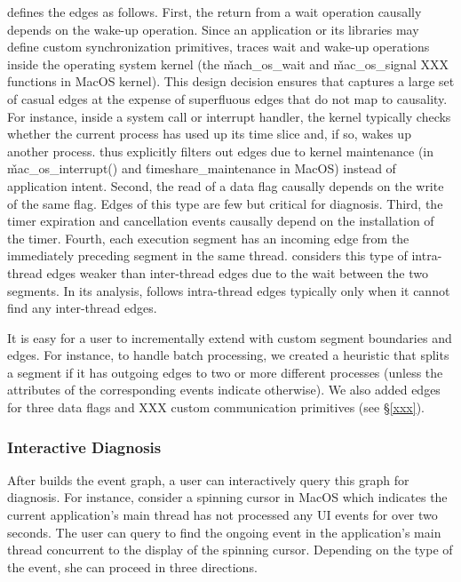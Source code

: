 \xxx defines the edges as follows.  First, the return from a wait
operation causally depends on the wake-up operation.  Since an application
or its libraries may define custom synchronization primitives, \xxx traces
wait and wake-up operations inside the operating system kernel (the
\v{mach\_os\_wait} and \v{mac\_os\_signal} XXX functions in MacOS kernel).
This design decision ensures that \xxx captures a large set of casual
edges at the expense of superfluous edges that do not map to causality.
For instance, inside a system call or interrupt handler, the kernel
typically checks whether the current process has used up its time slice
and, if so, wakes up another process.  \xxx thus explicitly filters out
edges due to kernel maintenance (in \v{mac\_os\_interrupt()} and
\v{timeshare\_maintenance in MacOS}) instead of application intent.
Second, the read of a data flag causally depends on the write of the
same flag.  Edges of this type are few but critical for diagnosis.  Third,
the timer expiration and cancellation events causally depend on the
installation of the timer.  Fourth, each execution segment has an incoming
edge from the immediately preceding segment in the same thread.  \xxx
considers this type of intra-thread edges weaker than inter-thread edges
due to the wait between the two segments.  In its analysis, \xxx follows
intra-thread edges typically only when it cannot find any inter-thread
edges.

It is easy for a user to incrementally extend \xxx with custom segment
boundaries and edges.  For instance, to handle batch processing, we
created a heuristic that splits a segment if it has outgoing edges to two
or more different processes (unless the attributes of the corresponding
events indicate otherwise).  We also added edges for three data flags and
XXX custom communication primitives (see \S\ref{xxx}).

\subsubsection{Interactive Diagnosis} \label{subsec:debug}

After \xxx builds the event graph, a user can interactively query this
graph for diagnosis.  For instance, consider a spinning cursor in MacOS
which indicates the current application's main thread has not processed
any UI events for over two seconds.  The user can query \xxx to find the
ongoing event in the application's main thread concurrent to the display
of the spinning cursor.  Depending on the type of the event, she can
proceed in three directions.

